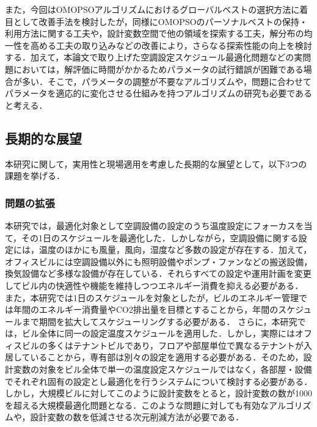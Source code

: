 また，今回はOMOPSOアルゴリズムにおけるグローバルベストの選択方法に着目として改善手法を検討したが，同様にOMOPSOのパーソナルベストの保持・利用方法に関する工夫や，設計変数空間で他の領域を探索する工夫，解分布の均一性を高める工夫の取り込みなどの改善により，さらなる探索性能の向上を検討する．加えて，本論文で取り上げた空調設定スケジュール最適化問題などの実問題においては，解評価に時間がかかるためパラメータの試行錯誤が困難である場合が多い．そこで，パラメータの調整が不要なアルゴリズムや，問題に合わせてパラメータを適応的に変化させる仕組みを持つアルゴリズムの研究も必要であると考える．

\begin{comment}
さらなるアルゴリズム改良のため，OMOPSOおよび提案したアルゴリズムが他のNSGA-IIIなどと比較して十分良好な結果が得られた理由を調査する必要がある．例えば，NSGA-IIIなどで採用されるアーカイブにはアーカイブサイズの制限があるが，OMOPSOではサイズ制限なく非劣解をすべて格納するアーカイブを持つ．この点が良好なHV値の獲得に有効に働いていると考えられるため，アーカイブサイズの効果を検証する必要がある．
\end{comment}

\subsection{長期的な展望}
本研究に関して，実用性と現場適用を考慮した長期的な展望として，以下3つの課題を挙げる．

\subsubsection{問題の拡張}
本研究では，最適化対象として空調設備の設定のうち温度設定にフォーカスを当て，その1日のスケジュールを最適化した．しかしながら，空調設備に関する設定には，温度のほかにも風量，風向，湿度など多数の設定が存在する．加えて，オフィスビルには空調設備以外にも照明設備やポンプ・ファンなどの搬送設備，換気設備など多様な設備が存在している．それらすべての設定や運用計画を変更してビル内の快適性や機能を維持しつつエネルギー消費を抑える必要がある．
また，本研究では1日のスケジュールを対象としたが，ビルのエネルギー管理では年間のエネルギー消費量やCO2排出量を目標とすることから，年間のスケジュールまで期間を拡大してスケジューリングする必要がある．
さらに，本研究では，ビル全体に同一の設定温度スケジュールを適用した．しかし，実際にはオフィスビルの多くはテナントビルであり，フロアや部屋単位で異なるテナントが入居していることから，専有部は別々の設定を適用する必要がある．そのため，設計変数の対象をビル全体で単一の温度設定スケジュールではなく，各部屋・設備でそれぞれ固有の設定とし最適化を行うシステムについて検討する必要がある．しかし，大規模ビルに対してこのように設計変数をとると，設計変数の数が1000を超える大規模最適化問題となる．このような問題に対しても有効なアルゴリズムや，設計変数の数を低減させる次元削減方法が必要である．

